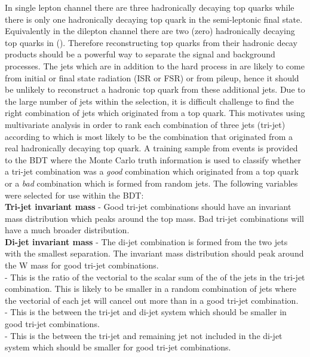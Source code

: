 In \tttt single lepton channel there are three hadronically decaying top quarks while there is only one hadronically decaying top quark in the semi-leptonic \ttbar final state. Equivalently in the dilepton channel there are two (zero) hadronically decaying top quarks in \tttt (\ttbar). Therefore reconstructing top quarks from their hadronic decay products should be a powerful way to separate the signal and background processes. The jets which are in addition to the hard process in \ttbar are likely to come from initial or final state radiation (ISR or FSR) or from pileup, hence it should be unlikely to reconstruct a hadronic top quark from these additional jets. Due to the large number of jets within the selection, it is difficult challenge to find the right combination of jets which originated from a top quark. This motivates using multivariate analysis in order to rank each combination of three jets (tri-jet) according to which is most likely to be the combination that originated from a real hadronically decaying top quark.
A training sample from \ttbar events is provided to the BDT where the Monte Carlo truth information is used to classify whether a tri-jet combination was a \emph{good} combination which originated from a top quark or a \emph{bad} combination which is formed from random jets. The following variables were selected for use within the BDT:\\
\textbf{Tri-jet invariant mass} - Good tri-jet combinations should have an invariant mass distribution which peaks around the top mass.
Bad tri-jet combinations will have a much broader distribution. \\
\textbf{Di-jet invariant mass} - The di-jet combination is formed from the two jets with the smallest \DR separation. The invariant mass distribution should peak around the W mass for good tri-jet combinations.\\
\textbf{\ptrat} - This is the ratio of the vectorial \pt to the scalar sum of the \pt of the jets in the tri-jet combination. This is likely to be smaller in a random combination of jets where the vectorial \pt of each jet will cancel out more than in a good tri-jet combination.\\
\textbf{\DPTW} - This is the \Dphi between the tri-jet and di-jet system which should be smaller in good tri-jet combinations.\\
\textbf{\DPTb} - This is the \Dphi between the tri-jet and remaining jet not included in the di-jet system which should be smaller for good tri-jet combinations.\\
